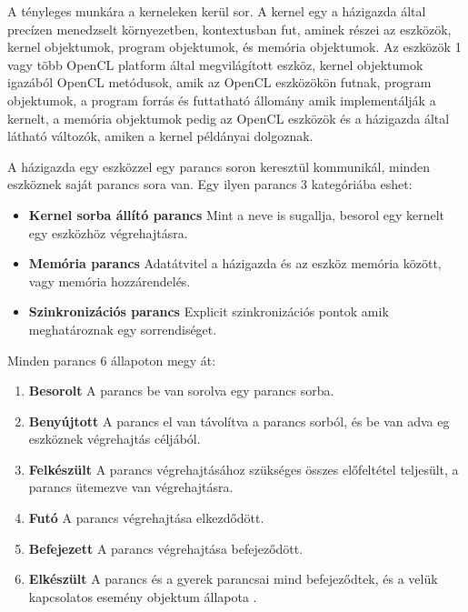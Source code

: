 A tényleges munkára a kerneleken kerül sor. A kernel egy a házigazda által precízen menedzselt környezetben, kontextusban fut, aminek részei az eszközök, kernel objektumok, program objektumok, és memória objektumok. Az eszközök 1 vagy több OpenCL platform által megvilágított eszköz, kernel objektumok igazából OpenCL metódusok, amik az OpenCL eszközökön futnak, program objektumok, a program forrás és futtatható állomány amik implementálják a kernelt, a memória objektumok pedig az OpenCL eszközök és a házigazda által látható változók, amiken a kernel példányai dolgoznak.

A házigazda egy eszközzel egy parancs soron keresztül kommunikál, minden eszköznek saját parancs sora van. Egy ilyen parancs 3 kategóriába eshet:
\begin{itemize}
\item\textbf{Kernel sorba állító parancs} Mint a neve is sugallja, besorol egy kernelt egy eszközhöz végrehajtásra.
\item\textbf{Memória parancs} Adatátvitel a házigazda és az eszköz memória között, vagy memória hozzárendelés.
\item\textbf{Szinkronizációs parancs} Explicit szinkronizációs pontok amik meghatároznak egy sorrendiséget.
\end{itemize}
Minden parancs 6 állapoton megy át:
\begin{enumerate}
\item\textbf{Besorolt} A parancs be van sorolva egy parancs sorba.
\item\textbf{Benyújtott} A parancs el van távolítva a parancs sorból, és be van adva eg eszköznek végrehajtás céljából.
\item\textbf{Felkészült} A parancs végrehajtásához szükséges összes előfeltétel teljesült, a parancs ütemezve van végrehajtásra.
\item\textbf{Futó} A parancs végrehajtása elkezdődött.
\item\textbf{Befejezett} A parancs végrehajtása befejeződött.
\item\textbf{Elkészült} A parancs és a gyerek parancsai mind befejeződtek, és a velük kapcsolatos esemény objektum állapota .
\end{enumerate}



